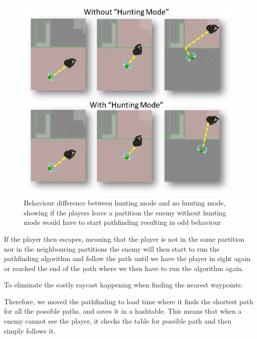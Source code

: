 \begin{figure}[H]
        \includegraphics[width=\textwidth]{figures/astar/huntingMode.png}
    \caption{Behaviour difference between hunting mode and no hunting mode, showing if the players leave a partition the enemy without hunting mode would have to start pathfinding resulting in odd behaviour}\label{huntingMode}
\end{figure}

If the player then escapes, meaning that the player is not in the same partition nor in the neighbouring partitions the enemy will then start to run the pathfinding algorithm and follow the path until we have the player in sight again or reached the end of the path where we then have to run the algorithm again.

To eliminate the costly raycast happening when finding the nearest waypoints.

Therefore, we moved the pathfinding to load time where it finds the shortest path for all the possible paths, and saves it in a hashtable.
This means that when a enemy cannot see the player, it checks the table for possible path and then simply follows it.

